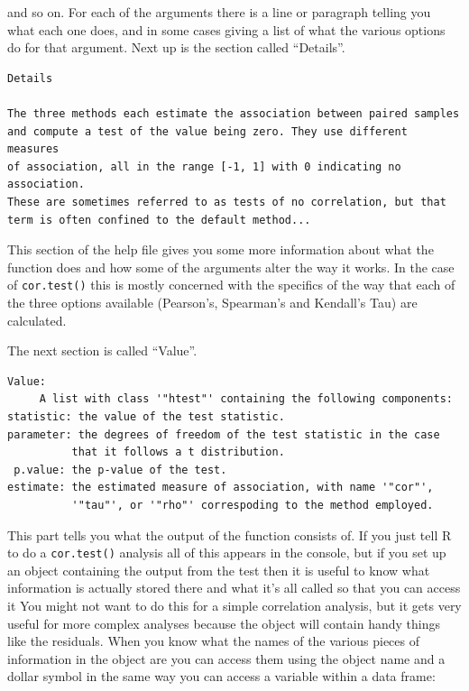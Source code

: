 \documentclass[
]{book}
\newenvironment{Shaded}{\begin{snugshade}}{\end{snugshade}}
\newcommand{\DecValTok}[1]{\textcolor[rgb]{0.00,0.00,0.81}{#1}}
\newcommand{\FloatTok}[1]{\textcolor[rgb]{0.00,0.00,0.81}{#1}}
\newcommand{\KeywordTok}[1]{\textcolor[rgb]{0.13,0.29,0.53}{\textbf{#1}}}
\newcommand{\NormalTok}[1]{#1}
\newcommand{\OperatorTok}[1]{\textcolor[rgb]{0.81,0.36,0.00}{\textbf{#1}}}
\begin{document}
and so on. For each of the arguments there is a line or paragraph telling you what each one does, and in some cases giving a list of what the various options do for that argument. Next up is the section called ``Details''.

\begin{verbatim}
Details

The three methods each estimate the association between paired samples 
and compute a test of the value being zero. They use different measures 
of association, all in the range [-1, 1] with 0 indicating no association. 
These are sometimes referred to as tests of no correlation, but that 
term is often confined to the default method...
\end{verbatim}

This section of the help file gives you some more information about what the function does and how some of the arguments alter the way it works. In the case of \texttt{cor.test()} this is mostly concerned with the specifics of the way that each of the three options available (Pearson's, Spearman's and Kendall's Tau) are calculated.

The next section is called ``Value''.

\begin{verbatim}
Value:
     A list with class '"htest"' containing the following components: 
statistic: the value of the test statistic.
parameter: the degrees of freedom of the test statistic in the case
          that it follows a t distribution.
 p.value: the p-value of the test.
estimate: the estimated measure of association, with name '"cor"',
          '"tau"', or '"rho"' correspoding to the method employed.
\end{verbatim}

This part tells you what the output of the function consists of. If you just tell R to do a \texttt{cor.test()} analysis all of this appears in the console, but if you set up an object containing the output from the test then it is useful to know what information is actually stored there and what it's all called so that you can access it You might not want to do this for a simple correlation analysis, but it gets very useful for more complex analyses because the object will contain handy things like the residuals. When you know what the names of the various pieces of information in the object are you can access them using the object name and a dollar symbol in the same way you can access a variable within a data frame:

\begin{Shaded}
\end{Shaded}
\end{document}
